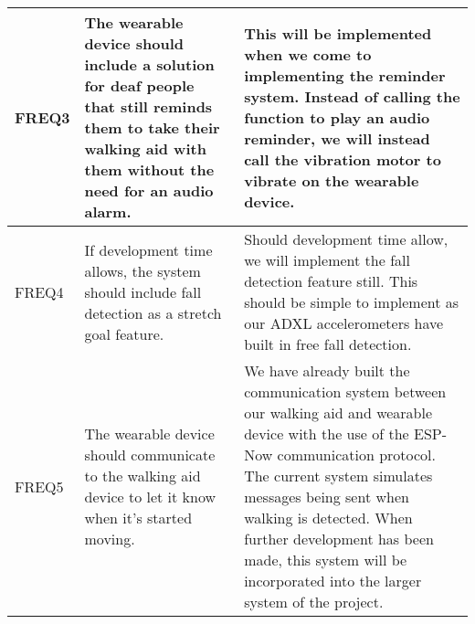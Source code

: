 \begin{xltabular}[H]{1.4\textwidth}{p{0.2\textwidth} | p{0.5\textwidth} | p{0.8\textwidth}}
        \midrule

        FREQ3

        &

        The wearable device should include a solution for deaf people that still reminds them to take their walking aid with them without the need for an audio alarm.

        &

        This will be implemented when we come to implementing the reminder system. Instead of calling the function to play an audio reminder, we will instead call the vibration motor to vibrate on the wearable device.\\

        \midrule

        FREQ4

        &

        If development time allows, the system should include fall detection as a stretch goal feature.

        &

        Should development time allow, we will implement the fall detection feature still. This should be simple to implement as our ADXL accelerometers have built in free fall detection.\\

        \midrule

        FREQ5

        &

        The wearable device should communicate to the walking aid device to let it know when it's started moving.

        &

        We have already built the communication system between our walking aid and wearable device with the use of the ESP-Now communication protocol. The current system simulates messages being sent when walking is detected. When further development has been made, this system will be incorporated into the larger system of the project.\\

	\end{xltabular}
	\label{tbl:func_reqs_table}
